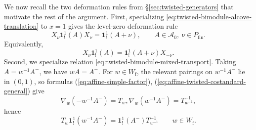 \documentclass{amsart}
\newcommand{\bone}{\mathbf{1}}
\theoremstyle{definition}
\numberwithin{equation}{section}
\begin{document}
We now recall the two deformation rules from
\S\ref{sec:twisted-generators} that motivate the rest of the argument. First,
specializing \eqref{eq:twisted-bimodule-alcove-translation} to \(x=1\) gives
the level-zero deformation rule
\begin{equation}\label{eq:levelzero-x-translation}
X_\nu\bone_!^1(A)X_\nu=\bone_!^1(A+\nu),
\qquad A\in\mathcal A_0,\ \nu\in P_{\mathrm{fin}}.
\end{equation}
Equivalently,
\begin{equation}\label{eq:levelzero-x-translation-one-sided}
X_\nu\bone_!^1(A)=\bone_!^1(A+\nu)X_{-\nu}.
\end{equation}
Second, we specialize relation
\eqref{eq:twisted-bimodule-mixed-transport}. Taking \(A=w^{-1}A^-\), we have
\(wA=A^-\). For \(w\in W_{\mathrm f}\), the relevant pairings
on \(w^{-1}A^-\) lie in \((0,1)\), so formulas (\ref{eq:affine-simple-factor}), (\ref{eq:affine-twisted-costandard-general}) give \[\nabla_w(-w^{-1}A^-)=T_w, \nabla_w(w^{-1}A^-)=T_{w^{-1}}^{-1},\] hence
\begin{equation}\label{eq:levelzero-finite-transport}
T_w\bone_!^1(w^{-1}A^-)
=
\bone_!^1(A^-)T_{w^{-1}}^{-1}
\qquad w\in W_{\mathrm f}.
\end{equation}
\end{document}
